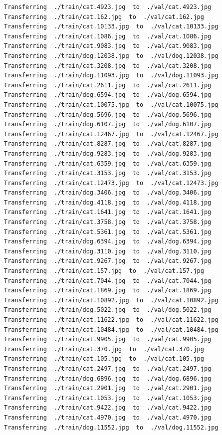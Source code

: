 \documentclass[]{book}
\theoremstyle{definition}
\theoremstyle{definition}
\theoremstyle{definition}
\theoremstyle{remark}
\begin{document}
\begin{verbatim}
Transferring  ./train/cat.4923.jpg  to  ./val/cat.4923.jpg
Transferring  ./train/cat.162.jpg  to  ./val/cat.162.jpg
Transferring  ./train/cat.10133.jpg  to  ./val/cat.10133.jpg
Transferring  ./train/cat.1086.jpg  to  ./val/cat.1086.jpg
Transferring  ./train/cat.9083.jpg  to  ./val/cat.9083.jpg
Transferring  ./train/dog.12038.jpg  to  ./val/dog.12038.jpg
Transferring  ./train/cat.3208.jpg  to  ./val/cat.3208.jpg
Transferring  ./train/dog.11093.jpg  to  ./val/dog.11093.jpg
Transferring  ./train/cat.2611.jpg  to  ./val/cat.2611.jpg
Transferring  ./train/dog.6594.jpg  to  ./val/dog.6594.jpg
Transferring  ./train/cat.10075.jpg  to  ./val/cat.10075.jpg
Transferring  ./train/dog.5696.jpg  to  ./val/dog.5696.jpg
Transferring  ./train/dog.6107.jpg  to  ./val/dog.6107.jpg
Transferring  ./train/cat.12467.jpg  to  ./val/cat.12467.jpg
Transferring  ./train/cat.8287.jpg  to  ./val/cat.8287.jpg
Transferring  ./train/dog.9283.jpg  to  ./val/dog.9283.jpg
Transferring  ./train/cat.6359.jpg  to  ./val/cat.6359.jpg
Transferring  ./train/cat.3153.jpg  to  ./val/cat.3153.jpg
Transferring  ./train/cat.12473.jpg  to  ./val/cat.12473.jpg
Transferring  ./train/dog.3406.jpg  to  ./val/dog.3406.jpg
Transferring  ./train/dog.4118.jpg  to  ./val/dog.4118.jpg
Transferring  ./train/cat.1641.jpg  to  ./val/cat.1641.jpg
Transferring  ./train/cat.3758.jpg  to  ./val/cat.3758.jpg
Transferring  ./train/cat.5361.jpg  to  ./val/cat.5361.jpg
Transferring  ./train/dog.6394.jpg  to  ./val/dog.6394.jpg
Transferring  ./train/dog.3110.jpg  to  ./val/dog.3110.jpg
Transferring  ./train/cat.9267.jpg  to  ./val/cat.9267.jpg
Transferring  ./train/cat.157.jpg  to  ./val/cat.157.jpg
Transferring  ./train/cat.7044.jpg  to  ./val/cat.7044.jpg
Transferring  ./train/cat.1869.jpg  to  ./val/cat.1869.jpg
Transferring  ./train/cat.10892.jpg  to  ./val/cat.10892.jpg
Transferring  ./train/dog.5022.jpg  to  ./val/dog.5022.jpg
Transferring  ./train/cat.11622.jpg  to  ./val/cat.11622.jpg
Transferring  ./train/cat.10484.jpg  to  ./val/cat.10484.jpg
Transferring  ./train/cat.9905.jpg  to  ./val/cat.9905.jpg
Transferring  ./train/cat.370.jpg  to  ./val/cat.370.jpg
Transferring  ./train/cat.105.jpg  to  ./val/cat.105.jpg
Transferring  ./train/cat.2497.jpg  to  ./val/cat.2497.jpg
Transferring  ./train/dog.6896.jpg  to  ./val/dog.6896.jpg
Transferring  ./train/cat.2901.jpg  to  ./val/cat.2901.jpg
Transferring  ./train/cat.1053.jpg  to  ./val/cat.1053.jpg
Transferring  ./train/cat.9422.jpg  to  ./val/cat.9422.jpg
Transferring  ./train/cat.4970.jpg  to  ./val/cat.4970.jpg
Transferring  ./train/dog.11552.jpg  to  ./val/dog.11552.jpg

\end{verbatim}
\end{document}
